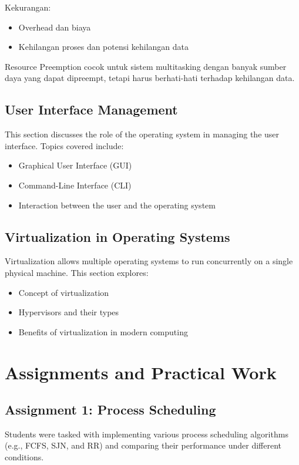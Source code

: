 \documentclass[12pt]{article}
\begin{document}
\begin{enumerate}
            \hspace{0cm} Kekurangan:
            \begin{itemize}
              \item Overhead dan biaya
              \item Kehilangan proses dan potensi kehilangan data
            \end{itemize}

          \hspace{1cm}Resource Preemption cocok untuk sistem multitasking dengan banyak sumber daya yang dapat dipreempt, tetapi harus berhati-hati terhadap kehilangan data.
\end{enumerate}

\subsection{User Interface Management}
This section discusses the role of the operating system in managing the user
interface. Topics covered include:
\begin{itemize}
    \item Graphical User Interface (GUI)
    \item Command-Line Interface (CLI)
    \item Interaction between the user and the operating system
\end{itemize}

\subsection{Virtualization in Operating Systems}
Virtualization allows multiple operating systems to run concurrently on a
single physical machine. This section explores:
\begin{itemize}
    \item Concept of virtualization
    \item Hypervisors and their types
    \item Benefits of virtualization in modern computing
\end{itemize}

\section{Assignments and Practical Work}
\subsection{Assignment 1: Process Scheduling}
Students were tasked with implementing various process scheduling algorithms
(e.g., FCFS, SJN, and RR) and comparing their performance under different
conditions.
\end{document}
